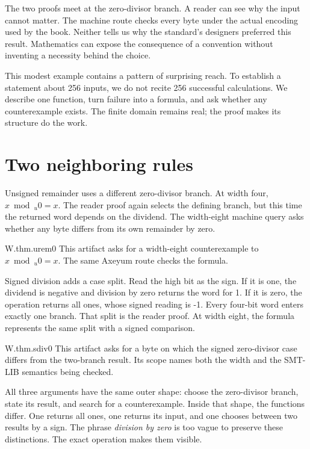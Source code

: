 The two proofs meet at the zero-divisor branch. A reader can see why the input
cannot matter. The machine route checks every byte under the actual
encoding used by the book. Neither tells us why the standard's designers
preferred this result. Mathematics can expose the consequence of a convention
without inventing a necessity behind the choice.

This modest example contains a pattern of surprising reach. To establish a
statement about 256 inputs, we do not recite 256 successful calculations. We
describe one function, turn failure into a formula, and ask whether any
counterexample exists. The finite domain remains real; the proof makes its
structure do the work.

\section{Two neighboring rules}
\label{sec:neighboring-rules}

Unsigned remainder uses a different zero-divisor branch. At width four,
\(x\bmod_u0=x\). The reader proof again selects the defining branch, but this
time the returned word depends on the dividend. The width-eight machine query
asks whether any byte differs from its own remainder by zero.

\begin{artifact}{W.thm.urem0}
This artifact asks for a width-eight counterexample to \(x\bmod_u0=x\). The
same Axeyum route checks the formula.
\end{artifact}

Signed division adds a case split. Read the high bit as the sign. If it is
one, the dividend is negative and division by zero returns the word for 1. If
it is zero, the operation returns all ones, whose signed reading is -1. Every
four-bit word enters exactly one branch. That split is the reader proof. At
width eight, the formula represents the same split with a signed comparison.

\begin{artifact}{W.thm.sdiv0}
This artifact asks for a byte on which the signed zero-divisor case differs
from the two-branch result. Its scope names both the width and the SMT-LIB
semantics being checked.
\end{artifact}

All three arguments have the same outer shape: choose the zero-divisor branch,
state its result, and search for a counterexample. Inside that shape, the
functions differ. One returns all ones, one returns its input, and one chooses
between two results by a sign. The phrase \emph{division by zero} is too vague
to preserve these distinctions. The exact operation makes them visible.


